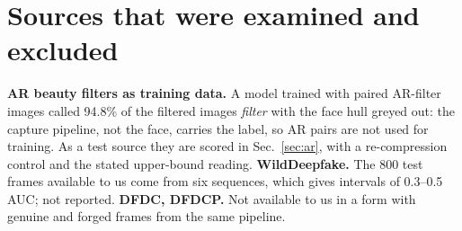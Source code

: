 \documentclass[10pt]{article}
\begin{document}
\section{Sources that were examined and excluded}
\label{sec:excluded}
\textbf{AR beauty filters as training data.} A model trained with paired AR-filter images called 94.8\% of the filtered images
\emph{filter} with the face hull greyed out: the capture pipeline, not the face, carries the label, so AR pairs are not used for
training. As a test source they are scored in Sec.~\ref{sec:ar}, with a re-compression control and the stated upper-bound reading.
\textbf{WildDeepfake.} The 800 test frames available to us come from six sequences, which gives intervals of 0.3--0.5 AUC; not
reported. \textbf{DFDC, DFDCP.} Not available to us in a form with genuine and forged frames from the same pipeline.



\end{document}
